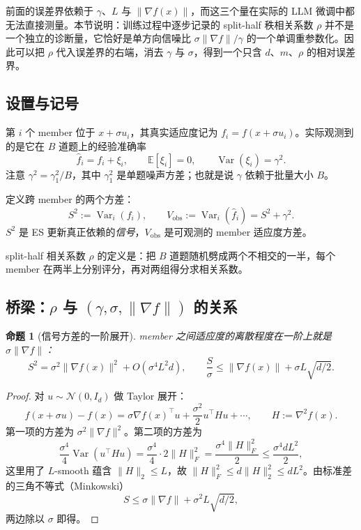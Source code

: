 \documentclass[UTF8]{ctexart}
\newtheorem{proposition}{命题}
\begin{document}
前面的误差界依赖于 $\gamma$、$L$ 与 $\|\nabla f(x)\|$，而这三个量在实际的 LLM 微调中都无法直接测量。本节说明：训练过程中逐步记录的 split-half 秩相关系数 $\rho$ 并不是一个独立的诊断量，它恰好是单方向信噪比 $\sigma\|\nabla f\|/\gamma$ 的一个单调重参数化。因此可以把 $\rho$ 代入误差界的右端，消去 $\gamma$ 与 $\sigma$，得到一个只含 $d$、$m$、$\rho$ 的相对误差界。

\subsection{设置与记号}

第 $i$ 个 member 位于 $x + \sigma u_i$，其真实适应度记为 $f_i = f(x + \sigma u_i)$。实际观测到的是它在 $B$ 道题上的经验准确率
\[
\widehat f_i = f_i + \xi_i,
\qquad
\mathbb E[\xi_i] = 0,
\qquad
\operatorname{Var}(\xi_i) = \gamma^2 .
\]
注意 $\gamma^2 = \gamma_1^2 / B$，其中 $\gamma_1^2$ 是单题噪声方差；也就是说 $\gamma$ 依赖于批量大小 $B$。

定义跨 member 的两个方差：
\[
S^2 := \operatorname{Var}_i(f_i),
\qquad
V_{\mathrm{obs}} := \operatorname{Var}_i(\widehat f_i) = S^2 + \gamma^2 .
\]
$S^2$ 是 ES 更新真正依赖的\emph{信号}，$V_{\mathrm{obs}}$ 是可观测的 member 适应度方差。

split-half 相关系数 $\rho$ 的定义是：把 $B$ 道题随机劈成两个不相交的一半，每个 member 在两半上分别评分，再对两组得分求相关系数。

\subsection{桥梁：$\rho$ 与 $(\gamma,\sigma,\|\nabla f\|)$ 的关系}

\begin{proposition}[信号方差的一阶展开]
\label{prop:signal}
member 之间适应度的离散程度在一阶上就是 $\sigma\|\nabla f\|$：
\[
\boxed{
S^2 = \sigma^2\|\nabla f(x)\|^2 + O(\sigma^4 L^2 d),
\qquad
\frac{S}{\sigma} \leq \|\nabla f(x)\| + \sigma L\sqrt{d/2}.
}
\]
\end{proposition}

\begin{proof}
对 $u\sim\mathcal N(0,I_d)$ 做 Taylor 展开：
\[
f(x+\sigma u) - f(x)
=
\sigma\nabla f(x)^\top u
+
\frac{\sigma^2}{2}u^\top H u
+
\cdots,
\qquad H := \nabla^2 f(x).
\]
第一项的方差为 $\sigma^2\|\nabla f\|^2$。第二项的方差为
\[
\frac{\sigma^4}{4}\operatorname{Var}(u^\top H u)
=
\frac{\sigma^4}{4}\cdot 2\|H\|_F^2
=
\frac{\sigma^4\|H\|_F^2}{2}
\leq
\frac{\sigma^4 d L^2}{2},
\]
这里用了 $L$-smooth 蕴含 $\|H\|_2\leq L$，故 $\|H\|_F^2\leq d\|H\|_2^2\leq dL^2$。由标准差的三角不等式（Minkowski）
\[
S \leq \sigma\|\nabla f\| + \sigma^2 L\sqrt{d/2},
\]
两边除以 $\sigma$ 即得。
\end{proof}
\end{document}
